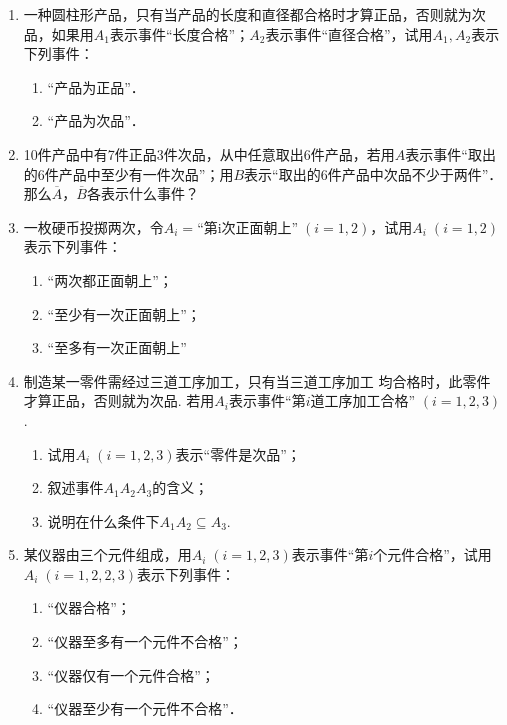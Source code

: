 \begin{enumerate}
    \item 一种圆柱形产品，只有当产品的长度和直径都合格时才算正品，否则就为次品，如果用$A_1$表示事件“长度合格”；$A_2$表示事件“直径合格”，试用$A_1,A_2$表示下列事件：
\begin{multicols}{2}
  \begin{enumerate}[(1)]
\item “产品为正品”．
\item “产品为次品”．
\end{enumerate}  
\end{multicols}

\item     10件产品中有7件正品3件次品，从中任意取出6件产品，若用$A$表示事件“取出的6件产品中至少有一件次品”；用$B$表示“取出的6件产品中次品不少于两件”．那么$\overline{A}$，$\overline{B}$各表示什么事件？
  \item   一枚硬币投掷两次，令$A_i=\text{“第i次正面朝上”}\; (i=1,2)$，试用$A_i\; (i=1,2)$表示下列事件：
\begin{enumerate}[(1)]
\item “两次都正面朝上”；
\item “至少有一次正面朝上”；
\item “至多有一次正面朝上”
\end{enumerate}

\item 制造某一零件需经过三道工序加工，只有当三道工序加工
均合格时，此零件才算正品，否则就为次品. 若用$A_i$表示事件“第$i$道工序加工合格” $(i=1,2,3)$. 
\begin{enumerate}[(1)]
    \item 试用$A_i\; (i=1,2,3)$表示“零件是次品”；
    \item 叙述事件$A_1A_2A_3$的含义；
    \item 说明在什么条件下$A_1A_2\subseteq A_3$.
\end{enumerate}

\item 某仪器由三个元件组成，用$A_i\; (i=1,2,3)$表示事件“第$i$个元件合格”，试用$A_i\; (i=1,2,2,3)$表示下列事件：
\begin{enumerate}[(1)]
\item “仪器合格”；
\item “仪器至多有一个元件不合格”；
\item “仪器仅有一个元件合格”；
\item “仪器至少有一个元件不合格”．
\end{enumerate}


\end{enumerate}
